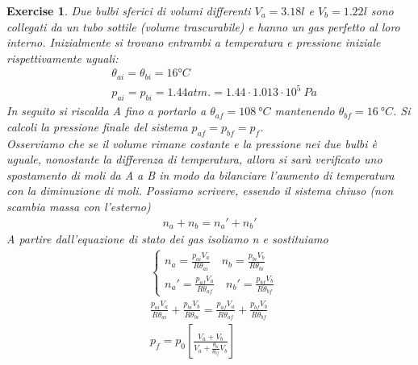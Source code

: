 \documentclass[10pt,a4paper]{article}
\newtheorem{exercise}{Exercise}
\begin{document}
\begin{exercise}
Due bulbi sferici di volumi differenti $V_a = 3.18 l$ e $V_b = 1.22 l$ sono collegati da un tubo sottile (volume trascurabile) e hanno un gas perfetto al loro interno. Inizialmente si trovano entrambi a temperatura e pressione iniziale rispettivamente uguali:
\begin{align*} 
&\theta_{ai} = \theta_{bi} = 16 °C\\
&p_{ai} = p_{bi} = 1.44 atm. = 1.44\cdot 1.013 \cdot 10^5\ Pa
\end{align*}  
In seguito si riscalda A fino a portarlo a $\theta_{af} = 108\ °C$ mantenendo $\theta_{bf} = 16\ °C$. Si calcoli la pressione finale del sistema $p_{af}=p_{bf}=p_f$.\\
Osserviamo che se il volume rimane costante e la pressione nei due bulbi è uguale, nonostante la differenza di temperatura, allora si sarà verificato uno spostamento di moli da A a B in modo da bilanciare l'aumento di temperatura con la diminuzione di moli. Possiamo scrivere, essendo il sistema chiuso (non scambia massa con l'esterno)
\begin{align*} 
	n_a + n_b = n_a' + n_b'
\end{align*} 
A partire dall'equazione di stato dei gas isoliamo n e sostituiamo
\begin{align*} 
	&\begin{cases}
	n_a = \frac{p_{ai} V_a}{R \theta_{ai}} \quad n_b = \frac{p_{bi} V_b}{R \theta_{bi}}\\
	n_a' = \frac{p_{af}V_a}{R \theta_{af}} \quad n_b'= \frac{p_{bf}V_b}{R \theta_{bf}}
	\end{cases}\\
	&\frac{p_{ai}V_a}{R \theta_{ai}} + \frac{p_{bi} V_b}{R \theta_{bi}} = \frac{p_{af}V_a}{R \theta_{af}} + \frac{p_{bf}V_b}{R \theta_{bf}}\\
	&p_f = p_0\left[\frac{V_a + V_b}{V_a + \frac{\theta_{bi}}{\theta_{bf}} V_b}\right]
\end{align*} 
\end{exercise}
\end{document}
